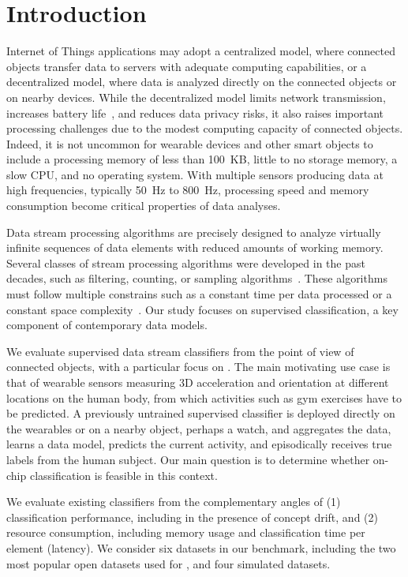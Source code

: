 \section{Introduction}
\label{sec:introduction}

Internet of Things applications may adopt a
centralized model, where connected objects transfer data to servers with 
adequate computing capabilities, or a decentralized model, where data is analyzed directly on the connected
objects or on nearby devices. While the decentralized model limits network transmission,
increases battery life~\cite{sensor-network-survey, sensor-energy-model},
and reduces data privacy risks, it also raises important processing challenges
due to the modest computing capacity of connected objects. Indeed, it is not uncommon for wearable devices and other smart objects
to include a processing memory of less than 100~KB, little to no storage
memory, a slow CPU, and no operating system. With multiple sensors
producing data at high frequencies, typically 50~Hz to 800~Hz, processing speed and
memory consumption become critical properties of data analyses. 

Data stream processing algorithms are precisely designed to analyze
virtually infinite sequences of data elements with reduced amounts of
working memory. Several classes of stream processing algorithms were
developed in the past decades, such as filtering, counting, or sampling
algorithms~\cite{kejariwal2015}.
These algorithms must follow multiple constrains
such as a constant time per data processed or a
constant space
complexity~\cite{issues_learning_from_stream}.
Our study focuses on supervised
classification, a key component of contemporary data models.

We evaluate supervised data stream classifiers from
the point of view of connected objects, with a
particular focus on \har. The main motivating use case is that of wearable
sensors measuring 3D acceleration and orientation at different locations on
the human body, from which activities such as gym exercises have to be
predicted. A previously untrained supervised classifier is deployed directly on the wearables or on
a nearby object, perhaps a watch, and aggregates the data, learns a data model, predicts the current
activity, and episodically receives true labels from the human subject. Our
main question is to determine whether on-chip classification is feasible in
this context. 

We evaluate existing classifiers from the complementary angles of (1)
classification performance, including in the presence of concept drift, and
(2) resource consumption, including memory usage and classification time
per element (latency). We consider six datasets in our benchmark, including
the two most popular open datasets used for \har, and
four simulated datasets. 


